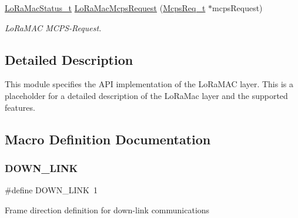 \begin{DoxyCompactItemize}
\hyperlink{group__LORAMAC_ga30bd25657e10480f8605ee951b0ecfbd}{Lo\+Ra\+Mac\+Status\+\_\+t} \hyperlink{group__LORAMAC_ga79768f8a3c22aaff84d4dfcc77ad508c}{Lo\+Ra\+Mac\+Mcps\+Request} (\hyperlink{group__LORAMAC_ga038e0fe5eecc1fc4e8165eace8e2e683}{Mcps\+Req\+\_\+t} $\ast$mcps\+Request)
\begin{DoxyCompactList}\small\item\em Lo\+Ra\+M\+AC M\+C\+P\+S-\/\+Request. \end{DoxyCompactList}\end{DoxyCompactItemize}


\subsection{Detailed Description}
This module specifies the A\+PI implementation of the Lo\+Ra\+M\+AC layer. This is a placeholder for a detailed description of the Lo\+Ra\+Mac layer and the supported features. 

\subsection{Macro Definition Documentation}
\mbox{\label{group__LORAMAC_ga801525db3ba12b250029f026403524b7}} 
\subsubsection{\texorpdfstring{D\+O\+W\+N\+\_\+\+L\+I\+NK}{DOWN\_LINK}}
{\footnotesize\ttfamily \#define D\+O\+W\+N\+\_\+\+L\+I\+NK~1}

Frame direction definition for down-\/link communications \mbox{\label{group__LORAMAC_ga9623296c345a3636f460ecdb8b1bbd9d}} 
